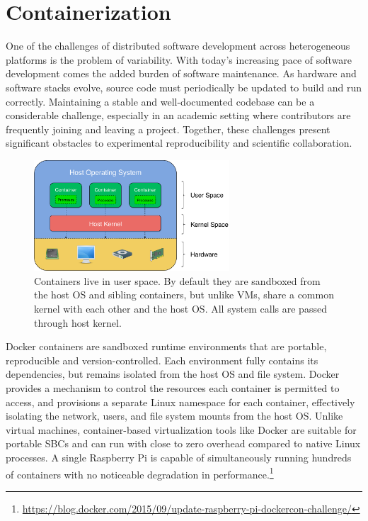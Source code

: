 \section{Containerization}\label{sec:containerization}

One of the challenges of distributed software development across heterogeneous platforms is the problem of variability. With today's increasing pace of software development comes the added burden of software maintenance. As hardware and software stacks evolve, source code must periodically be updated to build and run correctly. Maintaining a stable and well-documented codebase can be a considerable challenge, especially in an academic setting where contributors are frequently joining and leaving a project. Together, these challenges present significant obstacles to experimental reproducibility and scientific collaboration.

\begin{figure}[ht]
    \centering
    \includegraphics[width=0.65\textwidth]{../figures/user_kernel_hardware.png}
    \caption{Containers live in user space. By default they are sandboxed from the host OS and sibling containers, but unlike VMs, share a common kernel with each other and the host OS. All system calls are passed through host kernel.}
    \label{fig:user_kernel_hardware}
\end{figure}

Docker containers are sandboxed runtime environments that are portable, reproducible and version-controlled. Each environment fully contains its dependencies, but remains isolated from the host OS and file system. Docker provides a mechanism to control the resources each container is permitted to access, and provisions a separate Linux namespace for each container, effectively isolating the network, users, and file system mounts from the host OS. Unlike virtual machines, container-based virtualization tools like Docker are suitable for portable SBCs and can run with close to zero overhead compared to native Linux processes. A single Raspberry Pi is capable of simultaneously running hundreds of containers with no noticeable degradation in performance.\hspace{-.08em}\footnote{\url{https://blog.docker.com/2015/09/update-raspberry-pi-dockercon-challenge/}}

